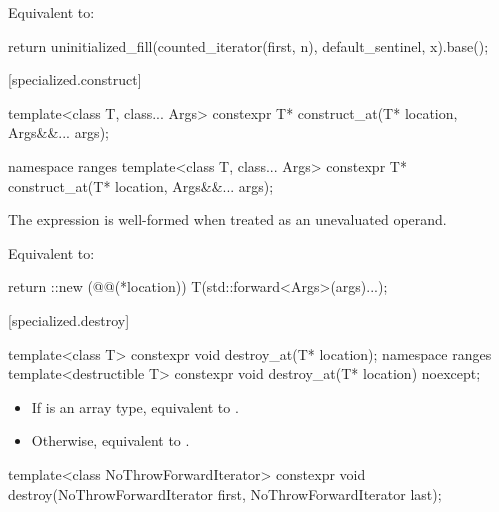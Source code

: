 \begin{itemdescr}
\pnum
\effects
Equivalent to:
\begin{codeblock}
return uninitialized_fill(counted_iterator(first, n), default_sentinel, x).base();
\end{codeblock}
\end{itemdescr}

[specialized.construct]{}

\begin{itemdecl}
template<class T, class... Args>
  constexpr T* construct_at(T* location, Args&&... args);

namespace ranges {
  template<class T, class... Args>
    constexpr T* construct_at(T* location, Args&&... args);
}
\end{itemdecl}

\begin{itemdescr}
\pnum
\constraints
The expression 
is well-formed when treated as an unevaluated operand.

\pnum
\effects
Equivalent to:
\begin{codeblock}
return ::new (@@(*location)) T(std::forward<Args>(args)...);
\end{codeblock}
\end{itemdescr}

[specialized.destroy]{}

%
\begin{itemdecl}
template<class T>
  constexpr void destroy_at(T* location);
namespace ranges {
  template<destructible T>
    constexpr void destroy_at(T* location) noexcept;
}
\end{itemdecl}

\begin{itemdescr}
\pnum
\effects
\begin{itemize}
\item If  is an array type, equivalent to
  .
\item Otherwise, equivalent to
  .
\end{itemize}
\end{itemdescr}

%
\begin{itemdecl}
template<class NoThrowForwardIterator>
  constexpr void destroy(NoThrowForwardIterator first, NoThrowForwardIterator last);
\end{itemdecl}

